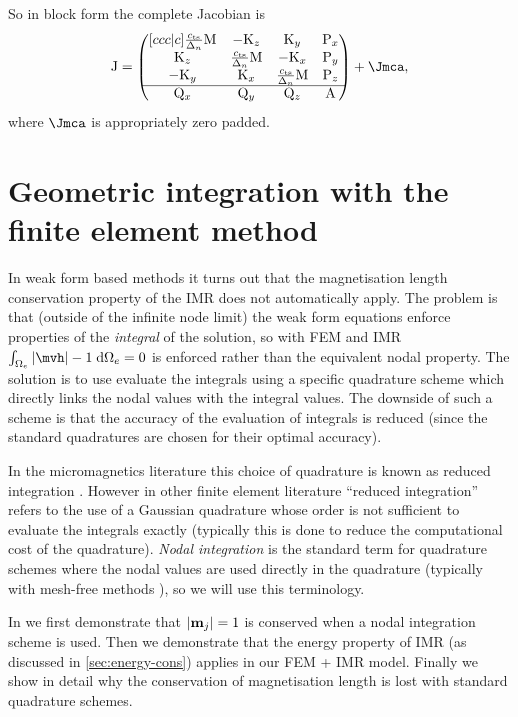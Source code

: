 {So in block form the complete Jacobian is
\begin{equation}
  \Jm =
  \begin{pmatrix}[ccc|c]
    \jts \Mm    & -\Km_z       & \Km_y      & \Pm_x \\
    \Km_z         & \jts\Mm    & -\Km_x     & \Pm_y \\
    -\Km_y        & \Km_x      & \jts \Mm & \Pm_z \\
    \hline
    \Qm_x       & \Qm_y      & \Qm_z    & \Am     \\
  \end{pmatrix} + \Jmca,
  \label{eq:full-monolithic-jac}
\end{equation}
where $\Jmca$ is appropriately zero padded.



\section{Geometric integration with the finite element method}
\label{sec:nodal-integration}

In weak form based methods it turns out that the magnetisation length conservation property of the IMR does not automatically apply.
The problem is that (outside of the infinite node limit) the weak form equations enforce properties of the \emph{integral} of the solution, so with FEM and IMR $\int_{\magd_e} \abs{\mvh} -1 \d\magd_e = 0$ is enforced rather than the equivalent nodal property.
The solution is to use evaluate the integrals using a specific quadrature scheme which directly links the nodal values with the integral values.
The downside of such a scheme is that the accuracy of the evaluation of integrals is reduced (since the standard quadratures are chosen for their optimal accuracy).

In the micromagnetics literature this choice of quadrature is known as reduced integration \cite{Cimrak2008}.
However in other finite element literature ``reduced integration'' refers to the use of a Gaussian quadrature whose order is not sufficient to evaluate the integrals exactly (typically this is done to reduce the computational cost of the quadrature).
\emph{Nodal integration} is the standard term for quadrature schemes where the nodal values are used directly in the quadrature (typically with mesh-free methods \eg \cite{Puso2008}), so we will use this terminology.

In  we first demonstrate that $\left|{\boldsymbol{\mathrm{m}}_j} \right|=1$ is conserved when a nodal integration scheme is used.
Then we demonstrate that the energy property of IMR (as discussed in \cref{sec:energy-cons}) applies in our FEM + IMR model.
Finally we show in detail why the conservation of magnetisation length is lost with standard quadrature schemes.


}

